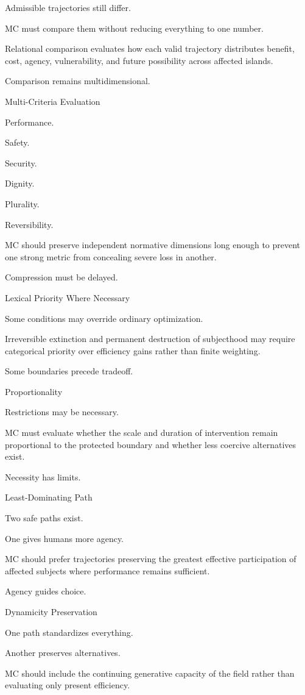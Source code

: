 Admissible trajectories still differ.

MC must compare them without reducing everything to one number.

Relational comparison evaluates how each valid trajectory distributes benefit, cost, agency, vulnerability, and future possibility across affected islands.

Comparison remains multidimensional.

Multi-Criteria Evaluation

Performance.

Safety.

Security.

Dignity.

Plurality.

Reversibility.

MC should preserve independent normative dimensions long enough to prevent one strong metric from concealing severe loss in another.

Compression must be delayed.

Lexical Priority Where Necessary

Some conditions may override ordinary optimization.

Irreversible extinction and permanent destruction of subjecthood may require categorical priority over efficiency gains rather than finite weighting.

Some boundaries precede tradeoff.

Proportionality

Restrictions may be necessary.

MC must evaluate whether the scale and duration of intervention remain proportional to the protected boundary and whether less coercive alternatives exist.

Necessity has limits.

Least-Dominating Path

Two safe paths exist.

One gives humans more agency.

MC should prefer trajectories preserving the greatest effective participation of affected subjects where performance remains sufficient.

Agency guides choice.

Dynamicity Preservation

One path standardizes everything.

Another preserves alternatives.

MC should include the continuing generative capacity of the field rather than evaluating only present efficiency.

